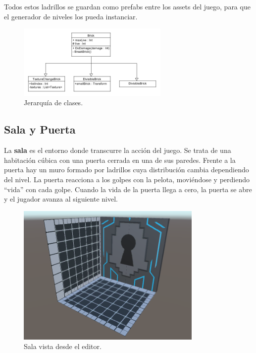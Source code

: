 Todos estos ladrillos se guardan como prefabs entre los assets del juego, para que el generador de niveles los pueda instanciar.

\begin{figure}[h]
	\includegraphics[width=0.65\textwidth]{images/estructura/objetos/brick_classes}
	\centering
	\caption{Jerarquía de clases.}
\end{figure}

\subsection{Sala y Puerta}
La \textbf{sala} es el entorno donde transcurre la acción del juego. Se trata de una habitación cúbica con una puerta cerrada en una de sus paredes. Frente a la puerta hay un muro formado por ladrillos cuya distribución cambia dependiendo del nivel. La puerta reacciona a los golpes con la pelota, moviéndose y perdiendo ``vida'' con cada golpe. Cuando la vida de la puerta llega a cero, la puerta se abre y el jugador avanza al siguiente nivel.

\begin{figure}[h]
	\includegraphics[width=0.8\textwidth]{images/estructura/objetos/captura_sala}
	\centering
	\caption{Sala vista desde el editor.}
\end{figure}

